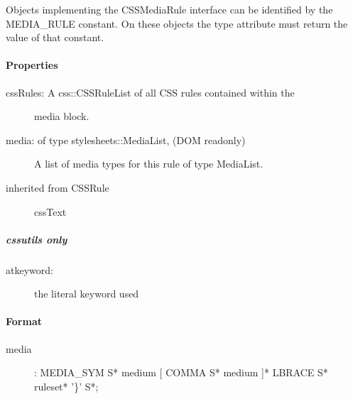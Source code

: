 Objects implementing the CSSMediaRule interface can be identified by the
MEDIA{\_}RULE constant. On these objects the type attribute must return the
value of that constant.



\hypertarget{properties}{}
\paragraph*{Properties}
\label{properties}
\begin{description}
\item[{cssRules: A css::CSSRuleList of all CSS rules contained within the}] \leavevmode 
media block.

\item[{media: of type stylesheets::MediaList, (DOM readonly)}] \leavevmode 
A list of media types for this rule of type MediaList.

\item[{inherited from CSSRule}] \leavevmode 
cssText

\end{description}



\hypertarget{cssutils-only}{}
\subparagraph*{cssutils only}
\label{cssutils-only}
\begin{description}
\item[{atkeyword:}] \leavevmode 
the literal keyword used

\end{description}



\hypertarget{format}{}
\paragraph*{Format}
\label{format}
\begin{description}
\item[{media}] \leavevmode 
: MEDIA{\_}SYM S* medium {[} COMMA S* medium {]}* LBRACE S* ruleset* '{\}}' S*;

\end{description}


